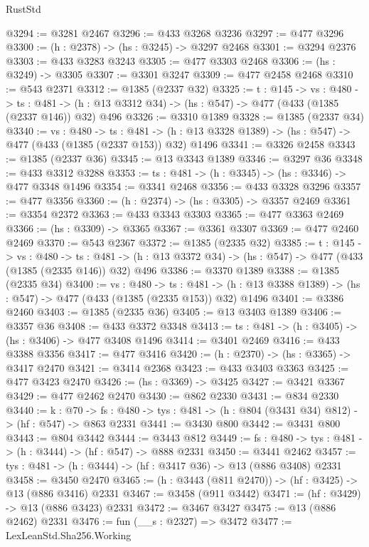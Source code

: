 \begin{lexlean}{RustStd}
\begin{coremodule}
{\begin{coremodule}
{{{{{{{@3294 := @3281 @2467
@3296 := @433 @3268 @3236
@3297 := @477 @3296
@3300 := (h : @2378) -> (hs : @3245) -> @3297 @2468
@3301 := @3294 @2376
@3303 := @433 @3283 @3243
@3305 := @477 @3303 @2468
@3306 := (hs : @3249) -> @3305
@3307 := @3301 @3247
@3309 := @477 @2458 @2468
@3310 := @543 @2371
@3312 := @1385 (@2337 @32)
@3325 := {t : @145} ->
  {vs : @480} ->
  {ts : @481} -> (h : @13 @3312 @34) -> (hs : @547) -> @477 (@433 (@1385 (@2337 @146)) @32) @496
@3326 := @3310 @1389
@3328 := @1385 (@2337 @34)
@3340 := {vs : @480} ->
  {ts : @481} -> (h : @13 @3328 @1389) -> (hs : @547) -> @477 (@433 (@1385 (@2337 @153)) @32) @1496
@3341 := @3326 @2458
@3343 := @1385 (@2337 @36)
@3345 := @13 @3343 @1389
@3346 := @3297 @36
@3348 := @433 @3312 @3288
@3353 := {ts : @481} -> (h : @3345) -> (hs : @3346) -> @477 @3348 @1496
@3354 := @3341 @2468
@3356 := @433 @3328 @3296
@3357 := @477 @3356
@3360 := (h : @2374) -> (hs : @3305) -> @3357 @2469
@3361 := @3354 @2372
@3363 := @433 @3343 @3303
@3365 := @477 @3363 @2469
@3366 := (hs : @3309) -> @3365
@3367 := @3361 @3307
@3369 := @477 @2460 @2469
@3370 := @543 @2367
@3372 := @1385 (@2335 @32)
@3385 := {t : @145} ->
  {vs : @480} ->
  {ts : @481} -> (h : @13 @3372 @34) -> (hs : @547) -> @477 (@433 (@1385 (@2335 @146)) @32) @496
@3386 := @3370 @1389
@3388 := @1385 (@2335 @34)
@3400 := {vs : @480} ->
  {ts : @481} -> (h : @13 @3388 @1389) -> (hs : @547) -> @477 (@433 (@1385 (@2335 @153)) @32) @1496
@3401 := @3386 @2460
@3403 := @1385 (@2335 @36)
@3405 := @13 @3403 @1389
@3406 := @3357 @36
@3408 := @433 @3372 @3348
@3413 := {ts : @481} -> (h : @3405) -> (hs : @3406) -> @477 @3408 @1496
@3414 := @3401 @2469
@3416 := @433 @3388 @3356
@3417 := @477 @3416
@3420 := (h : @2370) -> (hs : @3365) -> @3417 @2470
@3421 := @3414 @2368
@3423 := @433 @3403 @3363
@3425 := @477 @3423 @2470
@3426 := (hs : @3369) -> @3425
@3427 := @3421 @3367
@3429 := @477 @2462 @2470
@3430 := @862 @2330
@3431 := @834 @2330
@3440 := {k : @70} ->
  {fs : @480} -> {tys : @481} -> (h : @804 (@3431 @34) @812) -> (hf : @547) -> @863 @2331
@3441 := @3430 @800
@3442 := @3431 @800
@3443 := @804 @3442
@3444 := @3443 @812
@3449 := {fs : @480} -> {tys : @481} -> (h : @3444) -> (hf : @547) -> @888 @2331
@3450 := @3441 @2462
@3457 := {tys : @481} -> (h : @3444) -> (hf : @3417 @36) -> @13 (@886 @3408) @2331
@3458 := @3450 @2470
@3465 := (h : @3443 (@811 @2470)) -> (hf : @3425) -> @13 (@886 @3416) @2331
@3467 := @3458 (@911 @3442)
@3471 := (hf : @3429) -> @13 (@886 @3423) @2331
@3472 := @3467 @3427
@3475 := @13 (@886 @2462) @2331
@3476 := fun (__s : @2327) => @3472
@3477 := LexLeanStd.Sha256.Working
}}}}}}}
\end{coremodule}}
\end{coremodule}
\end{lexlean}
